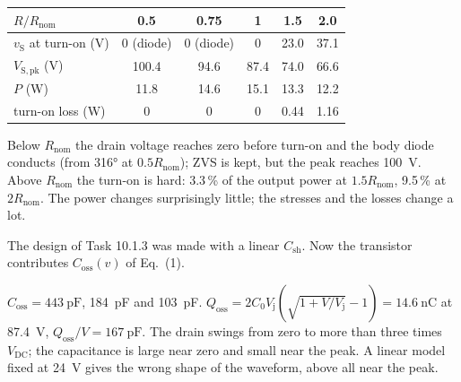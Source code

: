 \begin{solutionblock}
	\begin{center}
		\begin{tabular}{|l|c|c|c|c|c|}
			\hline
			$R/R_\mathrm{nom}$               & 0.5             & 0.75            & 1     & 1.5           & 2.0           \\
			\hline
			$v_\mathrm{S}$ at turn-on (V)    & 0 (diode)       & 0 (diode)       & 0     & 23.0          & 37.1          \\
			$V_\mathrm{S,pk}$ (V)            & 100.4           & 94.6            & 87.4  & 74.0          & 66.6          \\
			$P$ (W)                          & 11.8            & 14.6            & 15.1  & 13.3          & 12.2          \\
			turn-on loss (W)                 & 0               & 0               & 0     & 0.44          & 1.16          \\
			\hline
		\end{tabular}
		\label{tab:ex10_load}
	\end{center}
	Below $R_\mathrm{nom}$ the drain voltage reaches zero before turn-on and the body diode conducts (from \ang{316} at $0.5R_\mathrm{nom}$); ZVS is kept, but the peak reaches \SI{100}{\volt}. Above $R_\mathrm{nom}$ the turn-on is hard: 3.3\,\% of the output power at $1.5R_\mathrm{nom}$, 9.5\,\% at $2R_\mathrm{nom}$. The power changes surprisingly little; the stresses and the losses change a lot.
\end{solutionblock}



The design of Task 10.1.3 was made with a linear $C_\mathrm{sh}$. Now the transistor contributes $C_\mathrm{oss}(v)$ of Eq.~(1).


\begin{solutionblock}
	$C_\mathrm{oss}=\SI{443}{\pico\farad}$, \SI{184}{\pico\farad} and \SI{103}{\pico\farad}. $Q_\mathrm{oss}=2C_0V_\mathrm{j}\left(\sqrt{1+V/V_\mathrm{j}}-1\right)=\SI{14.6}{\nano\coulomb}$ at \SI{87.4}{\volt}, $Q_\mathrm{oss}/V=\SI{167}{\pico\farad}$. The drain swings from zero to more than three times $V_\mathrm{DC}$; the capacitance is large near zero and small near the peak. A linear model fixed at \SI{24}{\volt} gives the wrong shape of the waveform, above all near the peak.
\end{solutionblock}


